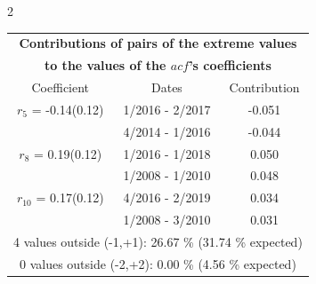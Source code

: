 
\thispagestyle{empty}
\begin{multicols}{2}{ 
\begin{tabular}{ccc}
\multicolumn{3}{c}{\textbf{Contributions of pairs of the extreme values} }  \vspace{-.10in}  \\ 
\multicolumn{3}{c}{ \textbf{to the values of the $acf$'s coefficients}} \\ 
\hline 
\hline                  Coefficient  &  Dates &  Contribution \\ 
\hline 
  $r_{ 5}$ = -0.14(0.12) &       1/2016 -  2/2017 &       -0.051    \vspace{-.10in} \\ 
  &        4/2014 -  1/2016 &       -0.044  \vspace{-.02in}   \\ \hline 
    $r_{ 8}$ = 0.19(0.12) &       1/2016 -  1/2018 &        0.050   \vspace{-.10in} \\  
&        1/2008 -  1/2010 &        0.048  \vspace{-.02in} \\ \hline 
  $r_{10}$ = 0.17(0.12) &       4/2016 -  2/2019 &        0.034   \vspace{-.10in} \\  
&        1/2008 -  3/2010 &        0.031  \vspace{-.02in} \\ \hline 
\multicolumn{3}{c}{               4 values outside (-1,+1): 26.67  \% (31.74  \% expected)}\vspace{-.10in} \\ 
\multicolumn{3}{c}{               0 values outside (-2,+2):  0.00 \%  (4.56 \% expected) } \\
 \end{tabular} \\ 
 } 
\end{multicols} 
